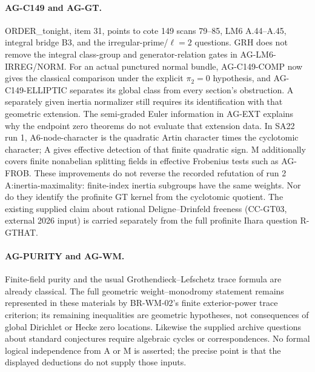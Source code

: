 \paragraph{AG-C149 and AG-GT.} ORDER\_tonight, item 31, points to cote
149 scans 79--85, LM6 A.44--A.45, integral bridge B3, and the
irregular-prime/$\ell=2$ questions. GRH does not remove the integral
class-group and generator-relation gates in AG-LM6-IRREG/NORM.
For an actual punctured normal bundle, AG-C149-COMP now gives the
classical comparison under the explicit $\pi_2=0$ hypothesis, and
AG-C149-ELLIPTIC separates its global class from every section's
obstruction. A separately given inertia normalizer still requires
its identification with that geometric extension.
The semi-graded Euler information in AG-EXT explains why the endpoint
zero theorems do not evaluate that extension data. In SA22 run 1,
A6-node-character is the quadratic Artin character times the cyclotomic
character; A gives effective detection of that finite quadratic sign.
M additionally covers finite nonabelian splitting fields in effective
Frobenius tests such as AG-FROB. These improvements do not reverse the
recorded refutation of run 2 A:inertia-maximality: finite-index inertia
subgroups have the same weights. Nor do they identify the profinite GT
kernel from the cyclotomic quotient. The existing supplied claim about
rational Deligne--Drinfeld freeness (CC-GT03, external 2026 input) is
carried separately from the full profinite Ihara question R-GTHAT.

\paragraph{AG-PURITY and AG-WM.} Finite-field purity and the usual
Grothendieck--Lefschetz trace formula are already classical. The full
geometric weight--monodromy statement remains represented in these
materials by BR-WM-02's finite exterior-power trace criterion; its
remaining inequalities are geometric hypotheses, not consequences of
global Dirichlet or Hecke zero locations. Likewise the supplied archive
questions about standard conjectures require algebraic cycles or
correspondences. No formal logical independence from A or M is asserted;
the precise point is that the displayed deductions do not supply those
inputs.
